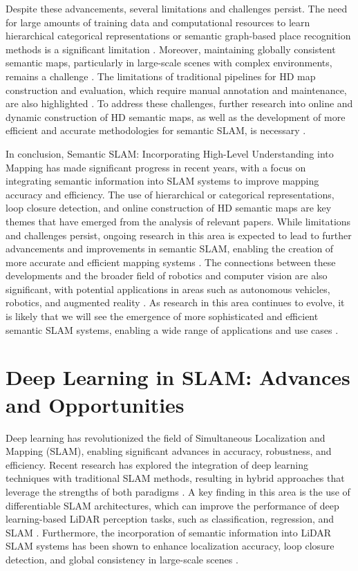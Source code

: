 \documentclass[conference]{IEEEtran}
\begin{document}
Despite these advancements, several limitations and challenges persist. The need for large amounts of training data and computational resources to learn hierarchical categorical representations or semantic graph-based place recognition methods is a significant limitation \cite{b9}. Moreover, maintaining globally consistent semantic maps, particularly in large-scale scenes with complex environments, remains a challenge \cite{b10}. The limitations of traditional pipelines for HD map construction and evaluation, which require manual annotation and maintenance, are also highlighted \cite{b11}. To address these challenges, further research into online and dynamic construction of HD semantic maps, as well as the development of more efficient and accurate methodologies for semantic SLAM, is necessary \cite{b12}.

In conclusion, Semantic SLAM: Incorporating High-Level Understanding into Mapping has made significant progress in recent years, with a focus on integrating semantic information into SLAM systems to improve mapping accuracy and efficiency. The use of hierarchical or categorical representations, loop closure detection, and online construction of HD semantic maps are key themes that have emerged from the analysis of relevant papers. While limitations and challenges persist, ongoing research in this area is expected to lead to further advancements and improvements in semantic SLAM, enabling the creation of more accurate and efficient mapping systems \cite{b13}. The connections between these developments and the broader field of robotics and computer vision are also significant, with potential applications in areas such as autonomous vehicles, robotics, and augmented reality \cite{b14}. As research in this area continues to evolve, it is likely that we will see the emergence of more sophisticated and efficient semantic SLAM systems, enabling a wide range of applications and use cases \cite{b15}.

\section{Deep Learning in SLAM: Advances and Opportunities}
Deep learning has revolutionized the field of Simultaneous Localization and Mapping (SLAM), enabling significant advances in accuracy, robustness, and efficiency. Recent research has explored the integration of deep learning techniques with traditional SLAM methods, resulting in hybrid approaches that leverage the strengths of both paradigms \cite{b1}. A key finding in this area is the use of differentiable SLAM architectures, which can improve the performance of deep learning-based LiDAR perception tasks, such as classification, regression, and SLAM \cite{b1}. Furthermore, the incorporation of semantic information into LiDAR SLAM systems has been shown to enhance localization accuracy, loop closure detection, and global consistency in large-scale scenes \cite{b3}.
\end{document}
